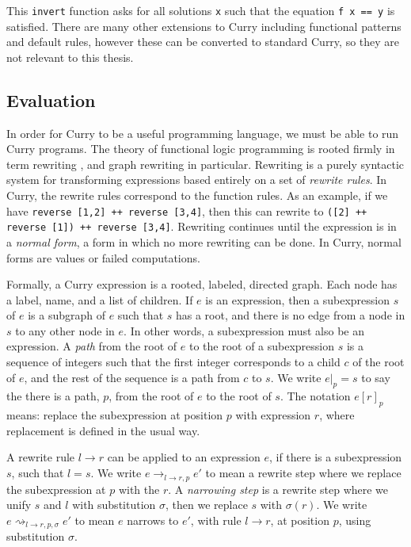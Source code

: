 This \texttt{invert} function asks for all solutions \texttt x such that the equation \texttt{f x == y} is satisfied.
There are many other extensions to Curry including functional patterns and default rules, however
these can be converted to standard Curry, so they are not relevant to this thesis.


\subsection{Evaluation}

In order for Curry to be a useful programming language, we must be able to run Curry programs.
The theory of functional logic programming is rooted firmly in term rewriting \cite{Klop92Handbook, Terese03}, 
and graph rewriting \cite{Plump99Handbook, EchahedJanodet97IMAG} in particular.
Rewriting is a purely syntactic system for transforming expressions based entirely on a set of \textit{rewrite rules}.
In Curry, the rewrite rules correspond to the function rules.
As an example, if we have \texttt{reverse [1,2] ++ reverse [3,4]},
then this can rewrite to \texttt{([2] ++ reverse [1]) ++ reverse [3,4]}.
Rewriting continues until the expression is in a \textit{normal form}, a form in which no more rewriting can be done.
In Curry, normal forms are values or failed computations.

Formally, a Curry expression is a rooted, labeled, directed graph.  Each node has a label, name, and a list of children.
If $e$ is an expression, then a subexpression $s$ of $e$ is a subgraph of $e$ 
such that $s$ has a root, and there is no edge from a node in $s$ to any other node in $e$.
In other words, a subexpression must also be an expression.
A \textit{path} from the root of $e$ to the root of a subexpression $s$ is a sequence of integers such that
the first integer corresponds to a child $c$ of the root of $e$, and the rest of the sequence is a path from $c$ to $s$.
We write $e|_p = s$ to say the there is a path, $p$, from the root of $e$ to the root of $s$.
The notation $e[r]_p$ means: replace the subexpression at position $p$ with expression $r$,
where replacement is defined in the usual way.

A rewrite rule $l \to r$ can be applied to an expression $e$, if there is a subexpression $s$, such that $l = s$.
We write $e\to_{l \to r, p} e'$ to mean a rewrite step where we replace the subexpression at $p$ with the $r$.
A \textit{narrowing step} is a rewrite step where we unify \cite{Klop92Handbook} $s$ and $l$ with substitution $\sigma$,
then we replace $s$ with $\sigma(r)$.
We write $e\rightsquigarrow_{l \to r, p, \sigma} e'$ to mean $e$ narrows to $e'$,
with rule $l \to r$, at position $p$, using substitution $\sigma$.

